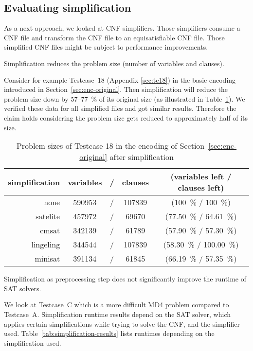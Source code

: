 \subsection{Evaluating simplification}
\label{sec:results-simplification}
%
As a next approach, we looked at CNF simplifiers. Those simplifiers consume a
CNF file and transform the CNF file to an equisatisfiable CNF file.
Those simplified CNF files might be subject to performance improvements.

\begin{prop}
  Simplification reduces the problem size (number of variables and clauses).
\end{prop}

Consider for example Testcase~18 (Appendix \ref{sec:tc18}) in the basic encoding
introduced in Section~\ref{sec:enc-original}. Then simplification will reduce the problem
size down by 57--77~\% of its original size (as illustrated in Table~\ref{tab:simpl-size}).
We verified these data for all simplified files and got similar results.
Therefore the claim holds considering the problem size gets reduced to
approximately half of its size.

\begin{table}[!h]
  \begin{center}
    \begin{tabular}{rcccc}
      \textbf{simplification} & \textbf{variables} &/& \textbf{clauses} & \textbf{(variables left / clauses left)} \\
    \hline
                none &    590953 &/& 107839  & (100~\% / 100~\%) \\
            satelite &    457972 &/& 69670   & (77.50~\% / 64.61~\%) \\
               cmsat &    342139 &/& 61789   & (57.90~\% / 57.30~\%) \\
           lingeling &    344544 &/& 107839  & (58.30~\% / 100.00~\%) \\
             minisat &    391134 &/& 61845   & (66.19~\% / 57.35~\%)
    \end{tabular}
    \caption{
        Problem sizes of Testcase 18 in the encoding of
        Section~\ref{sec:enc-original} after simplification
    }
    \label{tab:simpl-size}
  \end{center}
\end{table}

\begin{prop}
  Simplification as preprocessing step does not significantly improve the runtime of SAT solvers.
\end{prop}
%
We look at Testcase~C which is a more difficult MD4 problem
compared to Testcase~A. Simplification runtime results depend on the
SAT solver, which applies certain simplifications while trying to solve the
CNF, and the simplifier used. Table~\ref{tab:simplification-results}
lists runtimes depending on the simplification used.


